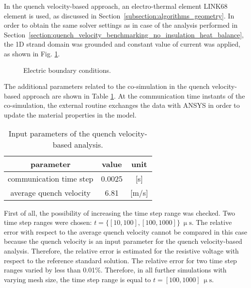 
In the quench velocity-based approach, an electro-thermal element LINK68 element is used, as discussed in Section~\ref{subsection:algorithms_geometry}. In order to obtain the same solver settings as in case of the analysis performed in Section~\ref{section:quench_velocity_benchmarking_no_insulation_heat_balance}, the 1D strand domain was grounded and constant value of current was applied, as shown in Fig. \ref{fig: q_vel_benchmarking_electrical_settings}.

\begin{figure}[H]
\centering
{}
\caption{Electric boundary conditions.}
\label{fig: q_vel_benchmarking_electrical_settings}
\end{figure}

The additional parameters related to the co-simulation in the quench velocity-based approach are shown in Table \ref{table: 1d_qv_benchmarking_geometry_parameters_quench_velocity}. At the communication time instants of the co-simulation, the external routine exchanges the data with ANSYS in order to update the material properties in the model. 

\begin{table}[H]
    \caption{Input parameters of the quench velocity-based analysis.} 
    \vspace{-1.em} 
    \fontsize{10}{10}
    \selectfont 
    \renewcommand{\arraystretch}{1.5}
    \begin{center}
        \begin{tabular}{ ccc }  
        \hline
        parameter & value & unit \\
        \hline
        communication time step & 0.0025 & [s] \\
        average quench velocity & 6.81 & [m/s] \\
        \hline 
        \end{tabular}
    \end{center}  
     \label{table: 1d_qv_benchmarking_geometry_parameters_quench_velocity} 
 \end{table}

First of all, the possibility of increasing the time step range was checked. Two time step ranges were chosen: $t=\{[10, 100], [100, 1000]\}~\upmu \text{s}$. The relative error with respect to the average quench velocity cannot be compared in this case because the quench velocity is an input parameter for the quench velocity-based analysis. Therefore, the relative error is estimated for the resistive voltage with respect to the reference standard solution. The relative error for two time step ranges varied by less than 0.01\%. Therefore, in all further simulations with varying mesh size, the time step range is equal to $t=[100, 1000]~\upmu \text{s}$.

